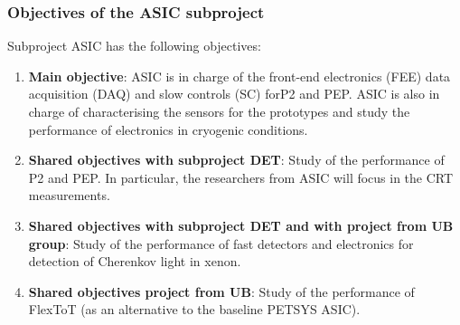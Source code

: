 \subsubsection*{Objectives of the ASIC subproject}
Subproject ASIC has the following objectives:
\begin{enumerate}
\item {\bf Main objective}: ASIC is in charge of the front-end electronics (FEE) data acquisition (DAQ) and slow controls (SC) forP2 and PEP. ASIC is also in charge of characterising the sensors for the prototypes and study the performance of electronics in cryogenic conditions. 
\item {\bf Shared objectives with subproject DET}: Study of the performance of P2 and PEP. In particular, the researchers from ASIC will focus in the CRT measurements. 
\item {\bf Shared objectives with subproject DET and with project from UB group}: Study of the performance of fast detectors and electronics for detection of Cherenkov light in xenon.
\item {\bf Shared objectives project from UB}: Study of the performance of FlexToT (as an alternative to the baseline PETSYS ASIC). 
\end{enumerate}

